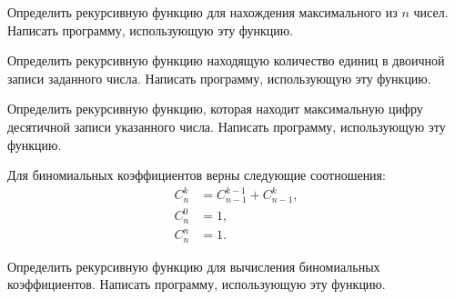 \task Определить рекурсивную функцию для нахождения максимального из
$n$ чисел. Написать программу, использующую эту функцию.

\task Определить рекурсивную функцию находящую количество единиц в
двоичной записи заданного числа. Написать программу, использующую эту
функцию.

\task Определить рекурсивную функцию, которая находит максимальную
цифру десятичной записи указанного числа. Написать программу,
использующую эту функцию.

\task Для биномиальных коэффициентов верны следующие соотношения:
\begin{align*}
  C_n^k &= C_{n-1}^{k-1} + C_{n-1}^k,\\
  C_n^0 &= 1,\\
  C_n^n &= 1.
\end{align*}

Определить рекурсивную функцию для вычисления биномиальных
коэффициентов. Написать программу, использующую эту функцию.
